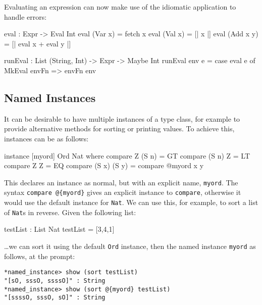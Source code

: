 \noindent
Evaluating an expression can now make use of the idiomatic application to handle
errors:

\begin{code}
eval : Expr -> Eval Int
eval (Var x)   = fetch x
eval (Val x)   = [| x |]
eval (Add x y) = [| eval x + eval y |]
  
runEval : List (String, Int) -> Expr -> Maybe Int
runEval env e = case eval e of
    MkEval envFn => envFn env
\end{code} 

\subsection{Named Instances}

It can be desirable to have multiple instances of a type class, for example to provide
alternative methods for sorting or printing values. To achieve this, instances can
be  as follows:

\begin{code}
instance [myord] Ord Nat where
   compare Z (S n)     = GT
   compare (S n) Z     = LT
   compare Z Z         = EQ
   compare (S x) (S y) = compare @{myord} x y
\end{code}

\noindent
This declares an instance as normal, but with an explicit name, \texttt{myord}.
The syntax \texttt{compare @\{myord\}} gives an explicit instance to 
\texttt{compare}, otherwise it would use the default instance for \texttt{Nat}.
We can use this, for example, to sort a list of \texttt{Nat}s in reverse.
Given the following list:

\begin{code}
testList : List Nat
testList = [3,4,1]
\end{code}

\noindent
\ldots we can sort it using the default \texttt{Ord} instance, then the named
instance \texttt{myord} as follows, at the \Idris{} prompt:

\begin{lstlisting}
*named_instance> show (sort testList)
"[sO, sssO, ssssO]" : String
*named_instance> show (sort @{myord} testList)
"[ssssO, sssO, sO]" : String
\end{lstlisting}


